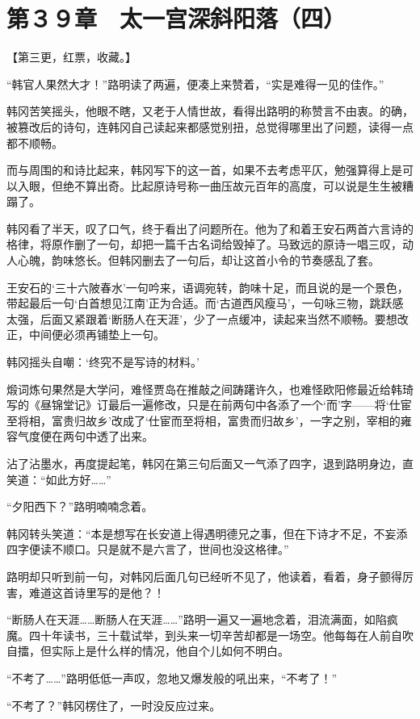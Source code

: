 \section{第３９章　太一宫深斜阳落（四）}

【第三更，红票，收藏。】

“韩官人果然大才！”路明读了两遍，便凑上来赞着，“实是难得一见的佳作。”

韩冈苦笑摇头，他眼不瞎，又老于人情世故，看得出路明的称赞言不由衷。的确，被篡改后的诗句，连韩冈自己读起来都感觉别扭，总觉得哪里出了问题，读得一点都不顺畅。

而与周围的和诗比起来，韩冈写下的这一首，如果不去考虑平仄，勉强算得上是可以入眼，但绝不算出奇。比起原诗号称一曲压故元百年的高度，可以说是生生被糟蹋了。

韩冈看了半天，叹了口气，终于看出了问题所在。他为了和着王安石两首六言诗的格律，将原作删了一句，却把一篇千古名词给毁掉了。马致远的原诗一唱三叹，动人心魄，韵味悠长。但韩冈删去了一句后，却让这首小令的节奏感乱了套。

王安石的‘三十六陂春水’一句吟来，语调宛转，韵味十足，而且说的是一个景色，带起最后一句‘白首想见江南’正为合适。而‘古道西风瘦马’，一句咏三物，跳跃感太强，后面又紧跟着‘断肠人在天涯’，少了一点缓冲，读起来当然不顺畅。要想改正，中间便必须再铺垫上一句。

韩冈摇头自嘲：‘终究不是写诗的材料。’

煅词炼句果然是大学问，难怪贾岛在推敲之间踌躇许久，也难怪欧阳修最近给韩琦写的《昼锦堂记》订最后一遍修改，只是在前两句中各添了一个‘而’字——将‘仕宦至将相，富贵归故乡’改成了‘仕宦而至将相，富贵而归故乡’，一字之别，宰相的雍容气度便在两句中透了出来。

沾了沾墨水，再度提起笔，韩冈在第三句后面又一气添了四字，退到路明身边，直笑道：“如此方好……”

“夕阳西下？”路明喃喃念着。

韩冈转头笑道：“本是想写在长安道上得遇明德兄之事，但在下诗才不足，不妄添四字便读不顺口。只是就不是六言了，世间也没这格律。”

路明却只听到前一句，对韩冈后面几句已经听不见了，他读着，看着，身子颤得厉害，难道这首诗里写的是他？！

“断肠人在天涯……断肠人在天涯……”路明一遍又一遍地念着，泪流满面，如陷疯魔。四十年读书，三十载试举，到头来一切辛苦却都是一场空。他每每在人前自吹自擂，但实际上是什么样的情况，他自个儿如何不明白。

“不考了……”路明低低一声叹，忽地又爆发般的吼出来，“不考了！”

“不考了？”韩冈楞住了，一时没反应过来。

